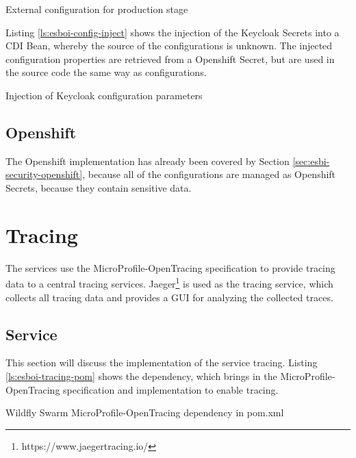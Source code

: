 \begin{listing}[h]
	\caption{External configuration for production stage}
	\label{ls:esboi-config-project-stages-prod}
\end{listing}

Listing \vref{ls:esboi-config-inject} shows the injection of the Keycloak Secrets into a CDI Bean, whereby the source of the configurations is unknown. The injected configuration properties are retrieved from a Openshift Secret, but are used in the source code the same way as configurations.

\begin{listing}[h]
	\caption{Injection of Keycloak configuration parameters}
	\label{ls:esboi-config-inject}
\end{listing}

\subsection{Openshift}
\label{sec:esbi-config-openshift}
The Openshift implementation has already been covered by Section \vref{sec:esbi-security-openshift}, because all of the configurations are managed as Openshift Secrets, because they contain sensitive data. 

\section{Tracing}
\label{sec:esbi-tracing}
The services use the MicroProfile-OpenTracing specification to provide tracing data to a central tracing services. Jaeger\footnote{https://www.jaegertracing.io/} is used as the tracing service, which collects all tracing data and provides a GUI for analyzing the collected traces. 

\subsection{Service}
\label{sec:esbi-tracing-service}
This section will discuss the implementation of the service tracing. Listing \vref{ls:esboi-tracing-pom} shows the dependency, which brings in the MicroProfile-OpenTracing specification and implementation to enable tracing. 

\begin{listing}[h]
	\caption{Wildfly Swarm MicroProfile-OpenTracing dependency in pom.xml}
	\label{ls:esboi-tracing-pom}
\end{listing}

